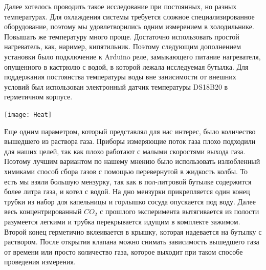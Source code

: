 \documentclass[12pt,a4paper]{scrartcl}
\begin{document}
Далее хотелось проводить такое исследование при постоянных, но разных температурах. Для охлаждения системы требуется сложное специализированное оборудование, поэтому мы удовлетворились одним измерением в холодильнике. Повышать же температуру много проще. Достаточно использовать простой нагреватель, как, наример, кипятильник. Поэтому следующим дополнением установки было подключение к Arduino реле, замыкающего питание нагревателя, опущенного в кастрюлю с водой, в которой лежала исследуемая бутылка. Для поддержания постоянства температуры воды вне занисимости от внешних условий был использован электронный датчик температуры DS18B20 в герметичном корпусе. 
\begin{flushleft}
\texttt{[image: Heat]}
\end{flushleft}

Еще одним параметром, который представлял для нас интерес, было количество вышедшего из раствора газа. Приборы измеряющие поток газа плохо подходили для наших целей, так как плохо работают с малыми скоростями выхода газа. Поэтому лучшим вариантом по нашему мнению было использовать излюбленный химиками способ сбора газов с помощью перевернутой в жидкость колбы. То есть мы взяли большую мензурку, так как в пол-литровой бутылке содержится более литра газа, и котел с водой. На дно мензурки прикрепляется один конец трубки из набор для капельницы и горлышко сосуда опускается под воду. Далее весь концентрированный $CO_2$ с прошлого эксперимента вытягивается из полости разумеется легкими и трубка перекрывается идущим в комплекте зажимом. Второй конец герметично вклеивается в крышку, которая надевается на бутылку с раствором. После открытия клапана можно снимать зависимость вышедшего газа от времени или просто количество газа, которое выходит при таком способе проведения измерения.
\end{document}
